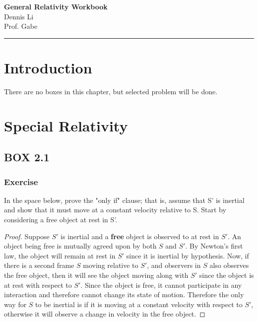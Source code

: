 \documentclass[12pt]{memoir}
\newif\ifshow
\begin{document}
\begin{center}
\ifshow
  \textbf{\Large GRW Workbook}\\
\else
  \textbf{\Large General Relativity Workbook}\\
\fi
Dennis Li\\Prof. Gabe\\
\end{center}

\hrule

\vspace{0.2cm}
\begingroup
\let\clearpage\relax
\chapter{Introduction}
\endgroup
There are no boxes in this chapter, but selected problem will be done.

\begingroup
\let\clearpage\relax
\chapter{Special Relativity}
\endgroup
\section{BOX 2.1}
\subsection{Exercise}
In the space below, prove the "only if" clause; that is, assume that S' is inertial and show that it must move at a constant velocity relative to S. Start by considering a free object at rest in S'.

\begin{proof}
    Suppose $S'$ is inertial and a \textbf{free} object is observed to at rest in $S'$. An object being free is mutually agreed upon by both $S$ and $S'$. By Newton's first law, the object will remain at rest in $S'$ since it is inertial by hypothesis. Now, if there is a second frame $S$ moving relative to $S'$, and observers in $S$ also observes the free object, then it will see the object moving along with $S'$ since the object is at rest with respect to $S'$. Since the object is free, it cannot participate in any interaction and therefore cannot change its state of motion. Therefore the only way for $S$ to be inertial is if it is moving at a constant velocity with respect to $S'$, otherwise it will observe a change in velocity in the free object.  
\end{proof}
\end{document}
